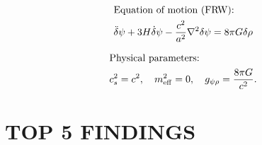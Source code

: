 \documentclass[aps,prd,twocolumn,nofootinbib]{revtex4-2}
\newcommand{\dpsi}{\delta\psi}
\begin{document}
\begin{align}
&\text{Equation of motion (FRW):}\notag\\
&\ddot\dpsi + 3H\dot\dpsi - \frac{c^2}{a^2}\nabla^2\dpsi = 8\pi G\delta\rho
\label{eq:EOM-frw}
\end{align}

\begin{align}
&\text{Physical parameters:}\notag\\
&c_s^2 = c^2,\quad m_{\rm eff}^2 = 0,\quad
g_{\psi\rho} = \frac{8\pi G}{c^2}.
\label{eq:params}
\end{align}

\section{TOP 5 FINDINGS}
\label{sec:findings}
\end{document}
